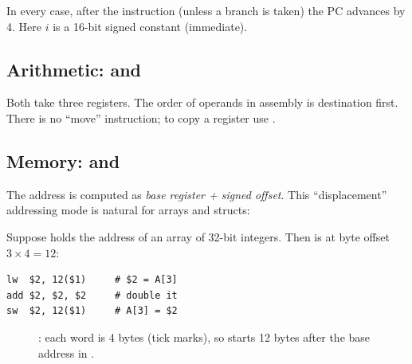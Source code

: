 In every case, after the instruction (unless a branch is taken) the PC
advances by 4. Here $i$ is a 16-bit signed constant (immediate).

\subsection{Arithmetic:  and }

Both take three registers. The order of operands in assembly is destination
first. There is no ``move'' instruction; to copy a register use
.

\subsection{Memory:  and }

The address is computed as \emph{base register + signed offset}. This
``displacement'' addressing mode is natural for arrays and structs:

\begin{example}
Suppose  holds the address of an array  of 32-bit integers.
Then  is at byte offset $3 \times 4 = 12$:
\begin{lstlisting}[style=mips]
lw  $2, 12($1)     # $2 = A[3]
add $2, $2, $2     # double it
sw  $2, 12($1)     # A[3] = $2
\end{lstlisting}
\end{example}

\begin{figure}[H]
\centering
{}
\caption{: each word is 4 bytes (tick marks), so
 starts 12 bytes after the base address in .}
\end{figure}


